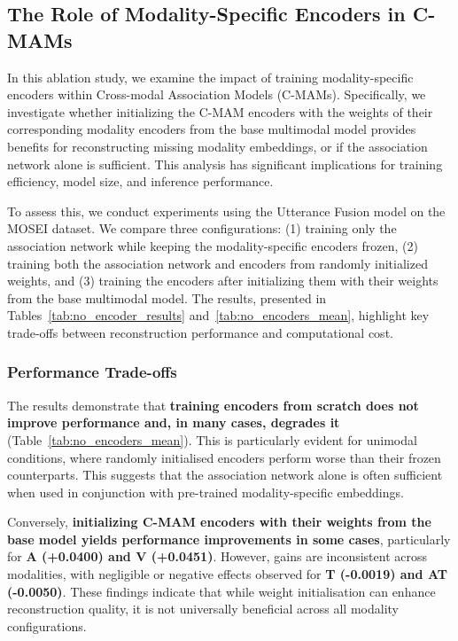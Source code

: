 \subsection{The Role of Modality-Specific Encoders in C-MAMs}
\label{sec:encoders}
In this ablation study, we examine the impact of training modality-specific encoders within Cross-modal Association Models (C-MAMs). Specifically, we investigate whether initializing the C-MAM encoders with the weights of their corresponding modality encoders from the base multimodal model provides benefits for reconstructing missing modality embeddings, or if the association network alone is sufficient. This analysis has significant implications for training efficiency, model size, and inference performance.

To assess this, we conduct experiments using the Utterance Fusion model on the MOSEI dataset. We compare three configurations: (1) training only the association network while keeping the modality-specific encoders frozen, (2) training both the association network and encoders from randomly initialized weights, and (3) training the encoders after initializing them with their weights from the base multimodal model. The results, presented in Tables~\ref{tab:no_encoder_results} and~\ref{tab:no_encoders_mean}, highlight key trade-offs between reconstruction performance and computational cost.

\subsubsection{Performance Trade-offs}
The results demonstrate that \textbf{training encoders from scratch does not improve performance and, in many cases, degrades it} (Table~\ref{tab:no_encoders_mean}). This is particularly evident for unimodal conditions, where randomly initialised encoders perform worse than their frozen counterparts. This suggests that the association network alone is often sufficient when used in conjunction with pre-trained modality-specific embeddings.

Conversely, \textbf{initializing C-MAM encoders with their weights from the base model yields performance improvements in some cases}, particularly for \textbf{A (+0.0400) and V (+0.0451)}. However, gains are inconsistent across modalities, with negligible or negative effects observed for \textbf{T (-0.0019) and AT (-0.0050)}. These findings indicate that while weight initialisation can enhance reconstruction quality, it is not universally beneficial across all modality configurations.


